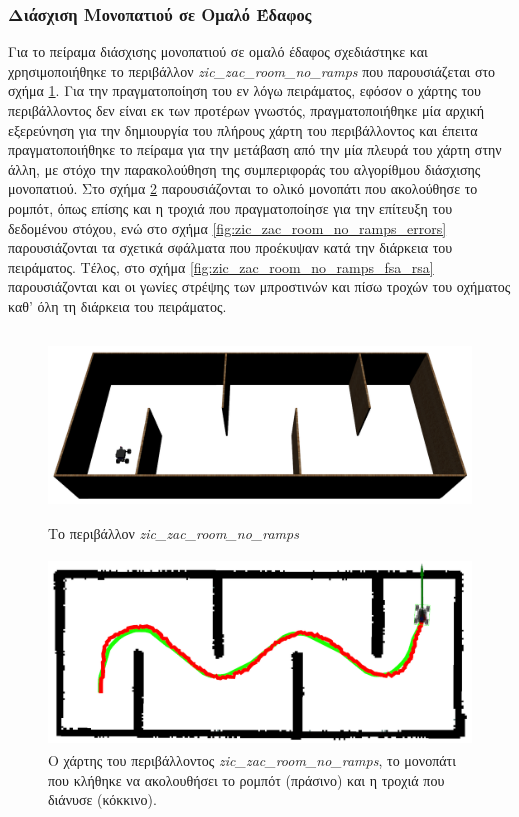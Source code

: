 \subsubsection{Διάσχιση Μονοπατιού σε Ομαλό Έδαφος}
Για το πείραμα διάσχισης μονοπατιού σε ομαλό έδαφος σχεδιάστηκε και χρησιμοποιήθηκε το περιβάλλον \textit{zic{\_}zac{\_}room{\_}no{\_}ramps} που παρουσιάζεται στο σχήμα \ref{fig:zic_zac_room_no_ramps}. Για την πραγματοποίηση του εν λόγω πειράματος, εφόσον ο χάρτης του περιβάλλοντος δεν είναι εκ των προτέρων γνωστός, πραγματοποιήθηκε μία αρχική εξερεύνηση για την δημιουργία του πλήρους χάρτη του περιβάλλοντος και έπειτα πραγματοποιήθηκε το πείραμα για την μετάβαση από την μία πλευρά του χάρτη στην άλλη, με στόχο την παρακολούθηση της συμπεριφοράς του αλγορίθμου διάσχισης μονοπατιού. Στο σχήμα \ref{fig:zic_zac_room_no_ramps_path_and_traj} παρουσιάζονται το ολικό μονοπάτι που ακολούθησε το ρομπότ, όπως επίσης και η τροχιά που πραγματοποίησε για την επίτευξη του δεδομένου στόχου, ενώ στο σχήμα \ref{fig:zic_zac_room_no_ramps_errors} παρουσιάζονται τα σχετικά σφάλματα που προέκυψαν κατά την διάρκεια του πειράματος. Τέλος, στο σχήμα \ref{fig:zic_zac_room_no_ramps_fsa_rsa} παρουσιάζονται και οι γωνίες στρέψης των μπροστινών και πίσω τροχών του οχήματος καθ' όλη τη διάρκεια του πειράματος.

\begin{figure}[!ht]
	\centering
	\includegraphics[height=5cm]{Chapters/Chapter5/Figures/ptc_experiments/zic_zac_room_no_ramps.png}
	\caption{Το περιβάλλον \textit{zic{\_}zac{\_}room{\_}no{\_}ramps}}
	\label{fig:zic_zac_room_no_ramps}
\end{figure}	
	
\begin{figure}[!ht]
	\centering
	\includegraphics[height=5cm]{Chapters/Chapter5/Figures/ptc_experiments/zic_zac_room_no_ramps_path_and_traj.png}
	\caption{Ο χάρτης του περιβάλλοντος \textit{zic{\_}zac{\_}room{\_}no{\_}ramps}, το μονοπάτι που κλήθηκε να ακολουθήσει το ρομπότ (πράσινο) και η τροχιά που διάνυσε (κόκκινο).}
	\label{fig:zic_zac_room_no_ramps_path_and_traj}
\end{figure}

